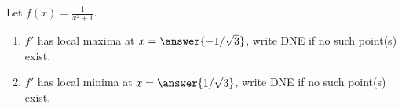 \documentclass{ximera}
\author{Gregory Hartman \and Matthew Carr}
\begin{document}
\begin{exercise}






Let $f(x)=\frac{1}{x^2+1}$.
\begin{enumerate}
\item		$f'$ has local maxima at $x=\answer{-1/\sqrt{3}}$, write DNE if no such point(s) exist.
\item		$f'$ has local minima at $x=\answer{1/\sqrt{3}}$, write DNE if no such point(s) exist.
\end{enumerate}

\end{exercise}
\end{document}
